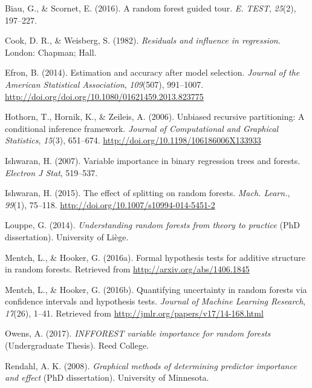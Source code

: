 \documentclass[12pt,twoside]{reedthesis}
\theoremstyle{definition}
\theoremstyle{definition}
\theoremstyle{definition}
\theoremstyle{remark}
\begin{document}

\noindent

\setlength{\parindent}{-0.20in} \setlength{\leftskip}{0.20in}
\setlength{\parskip}{8pt}

\hypertarget{refs}{}
\hypertarget{ref-biau2015a}{}
Biau, G., \& Scornet, E. (2016). A random forest guided tour. \emph{E.
TEST}, \emph{25}(2), 197--227.

\hypertarget{ref-cook1982}{}
Cook, D. R., \& Weisberg, S. (1982). \emph{Residuals and influence in
regression}. London: Chapman; Hall.

\hypertarget{ref-efron2014}{}
Efron, B. (2014). Estimation and accuracy after model selection.
\emph{Journal of the American Statistical Association}, \emph{109}(507),
991--1007. \url{http://doi.org/doi.org/10.1080/01621459.2013.823775}

\hypertarget{ref-hothorn2006}{}
Hothorn, T., Hornik, K., \& Zeileis, A. (2006). Unbiased recursive
partitioning: A conditional inference framework. \emph{Journal of
Computational and Graphical Statistics}, \emph{15}(3), 651--674.
\url{http://doi.org/10.1198/106186006X133933}

\hypertarget{ref-ishwaran2007}{}
Ishwaran, H. (2007). Variable importance in binary regression trees and
forests. \emph{Electron J Stat}, 519--537.

\hypertarget{ref-ishwaran2015}{}
Ishwaran, H. (2015). The effect of splitting on random forests.
\emph{Mach. Learn.}, \emph{99}(1), 75--118.
\url{http://doi.org/10.1007/s10994-014-5451-2}

\hypertarget{ref-louppe2014}{}
Louppe, G. (2014). \emph{Understanding random forests from theory to
practice} (PhD dissertation). University of Liège.

\hypertarget{ref-mentch2016b}{}
Mentch, L., \& Hooker, G. (2016a). Formal hypothesis tests for additive
structure in random forests. Retrieved from
\url{http://arxiv.org/abs/1406.1845}

\hypertarget{ref-mentch2016a}{}
Mentch, L., \& Hooker, G. (2016b). Quantifying uncertainty in random
forests via confidence intervals and hypothesis tests. \emph{Journal of
Machine Learning Research}, \emph{17}(26), 1--41. Retrieved from
\url{http://jmlr.org/papers/v17/14-168.html}

\hypertarget{ref-owens2017}{}
Owens, A. (2017). \emph{INFFOREST variable importance for random
forests} (Undergraduate Thesis). Reed College.

\hypertarget{ref-rendahl2008}{}
Rendahl, A. K. (2008). \emph{Graphical methods of determining predictor
importance and effect} (PhD dissertation). University of Minnesota.
\end{document}
